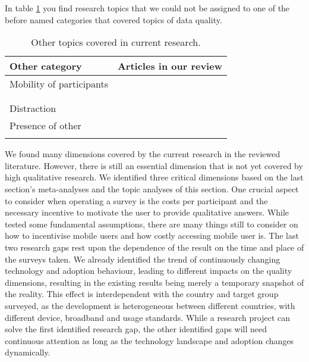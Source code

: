 In table \ref{tab: other} you find research topics that we could not be assigned to one of the before named categories that covered topics of data quality.

\begin{table}
    \centering
    \begin{tabular}{ll}
        \toprule
        Other category & Articles in our review\\
        \midrule
        Mobility of participants & \cite{de_bruijne_comparing_2013, mavletova_data_2013}\\
        & \cite{antoun_effects_2017, mavletova_sensitive_2013}\\
        & \cite{toninelli_smartphones_2016}\\
        Distraction & \cite{antoun_effects_2017, toninelli_smartphones_2016}\\
        Presence of other & \cite{antoun_effects_2017, mavletova_sensitive_2013}\\
        & \cite{toninelli_smartphones_2016}\\
        \bottomrule
    \end{tabular}
    \caption{Other topics covered in current research.}
    \label{tab: other}
\end{table}

We found many dimensions covered by the current research in the reviewed literature. However, there is still an essential dimension that is not yet covered by high qualitative research. We identified three critical dimensions based on the last section's meta-analyses and the topic analyses of this section. One crucial aspect to consider when operating a survey is the costs per participant and the necessary incentive to motivate the user to provide qualitative answers. While \cite{mavletova_device_2016} tested some fundamental assumptions, there are many things still to consider on how to incentivise mobile users and how costly accessing mobile user is. The last two research gaps rest upon the dependence of the result on the time and place of the surveys taken. We already identified the trend of continuously changing technology and adoption behaviour, leading to different impacts on the quality dimensions, resulting in the existing results being merely a temporary snapshot of the reality. This effect is interdependent with the country and target group surveyed, as the development is heterogeneous between different countries, with different device, broadband and usage standards. While a research project can solve the first identified research gap, the other identified gaps will need continuous attention as long as the technology landscape and adoption changes dynamically. 


